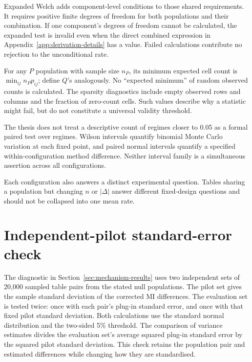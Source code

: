Expanded Welch adds component-level conditions to those shared requirements.
It requires positive finite degrees of
freedom for both populations and their combination. If one component's
degrees of freedom cannot be calculated, the expanded test is invalid even
when the direct combined expression in
Appendix~\ref{app:derivation-details} has a value. Failed calculations
contribute no rejection to the unconditional rate.

For any \(P\) population with sample size \(n_P\), its minimum expected
cell count is \(\min_{ij}n_Pp_{ij}\); define \(Q\)'s analogously. No
``expected minimum'' of random observed counts is calculated. The
sparsity diagnostics include empty observed rows and columns and the fraction
of zero-count cells. Such values describe why a statistic might fail, but
do not constitute a universal validity threshold.

The thesis does not treat a descriptive count of regimes closer to 0.05 as
a formal paired test over regimes. Wilson intervals quantify binomial Monte
Carlo variation at each fixed point, and paired normal intervals quantify a
specified within-configuration method difference. Neither interval family is
a simultaneous assertion across all configurations.

Each configuration also answers a distinct experimental question. Tables sharing a
population but changing \(n\) or \(|\Delta|\) answer different fixed-design
questions and should not be collapsed into one mean rate.

\section{Independent-pilot standard-error check}

The diagnostic in Section~\ref{sec:mechanism-results} uses two independent
sets of 20,000 sampled table pairs from the stated null populations. The
pilot set gives the sample standard deviation of the corrected MI
differences. The evaluation set is tested twice: once with each pair's
plug-in standard error, and once with that fixed pilot standard deviation.
Both calculations use the standard normal distribution and the two-sided
5\% threshold. The comparison of variance estimates divides the evaluation
set's average squared plug-in standard error by the squared pilot standard
deviation. This check retains the population pair and estimated differences
while changing how they are standardised.
